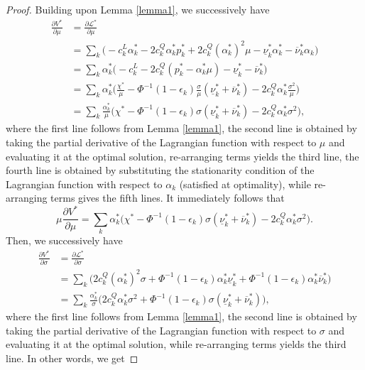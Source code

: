\documentclass{article}
\begin{document}
\begin{proof}
Building upon Lemma \ref{lemma1}, we successively have
\begin{align*} 
\frac{\partial V^*}{\partial \mu} &= \frac{\partial \mathcal{L}^*}{\partial \mu}\\
&= \sum_k\big(-c_k^L \alpha_k^* - 2c_k^Q \alpha_k^* p_k^* + 2 c_k^Q (\alpha_k^*)^2 \mu - \underline{\nu}_k^* \alpha_k^* - \overline{\nu}_k^* \alpha_k \big)\\
&= \sum_k\alpha_k^*\big(-c_k^L-2c_k^Q(p_k^*-\alpha_k^* \mu)-\underline{\nu}_k^*-\overline{\nu}_k^*\big)\\
&= \sum_k\alpha_k^*\Big(\frac{\chi^*}{\mu} - \Phi^{-1}(1-\epsilon_k) \frac{\sigma}{\mu}(\underline{\nu}_k^*+\overline{\nu}_k^*) - 2c_k^Q \alpha_k^* \frac{\sigma^2}{\mu}\Big)\\
&= \sum_k\frac{\alpha_k^*}{\mu}\Big(\chi^* - \Phi^{-1}(1-\epsilon_k) \sigma(\underline{\nu}_k^*+\overline{\nu}_k^*) - 2c_k^Q \alpha_k^* \sigma^2\Big),
\end{align*}
where the first line follows from Lemma \ref{lemma1}, the second line is obtained by taking the partial derivative of the Lagrangian function with respect to $\mu$ and evaluating it at the optimal solution, re-arranging terms yields the third line, the fourth line is obtained by substituting the stationarity condition of the Lagrangian function with respect to $\alpha_k$ (satisfied at optimality), while re-arranging terms gives the fifth lines. It immediately follows that
\begin{equation*}
\mu \frac{\partial V^*}{\partial \mu} = \sum_k\alpha_k^*\Big(\chi^* - \Phi^{-1}(1-\epsilon_k) \sigma(\underline{\nu}_k^*+\overline{\nu}_k^*) - 2c_k^Q \alpha_k^* \sigma^2\Big).
\end{equation*}
Then, we successively have
\begin{align*}
\frac{\partial V^*}{\partial \sigma} &= \frac{\partial \mathcal{L}^*}{\partial \sigma}\\
&= \sum_k\big(2c_k^Q(\alpha_k^*)^2\sigma + \Phi^{-1}(1-\epsilon_k) \alpha_k^* \underline{\nu}_k^* + \Phi^{-1}(1-\epsilon_k) \alpha_k^* \overline{\nu}_k^*\big)\\
&=\sum_k\frac{\alpha_k^*}{\sigma}\Big(2c_k^Q\alpha_k^*\sigma^2 + \Phi^{-1}(1-\epsilon_k) \sigma (\underline{\nu}_k^* + \overline{\nu}_k^*)\Big),
\end{align*}
where the first line follows from Lemma \ref{lemma1}, the second line is obtained by taking the partial derivative of the Lagrangian function with respect to $\sigma$ and evaluating it at the optimal solution, while re-arranging terms yields the third line. In other words, we get

\end{proof}
\end{document}
